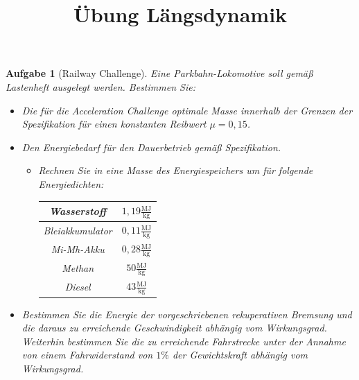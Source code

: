 \documentclass[11pt,a4paper,headsepline]{scrartcl}
\title{\"Ubung L\"angsdynamik}
\date{}
\newtheorem{aufgabe}{Aufgabe}
\begin{document}
\maketitle
\thispagestyle{fancy}
\pagestyle{fancy}
\vspace{-2cm}

\begin{aufgabe}[Railway Challenge]
\label{Ta:Acceleration}
Eine Parkbahn-Lokomotive soll gem\"a{\ss} Lastenheft ausgelegt werden. Bestimmen Sie:
\begin{itemize}
	\item Die f\"ur die Acceleration Challenge optimale Masse innerhalb der Grenzen der Spezifikation f\"ur einen konstanten Reibwert $\mu = 0{,}15$.
	\item Den Energiebedarf f\"ur den Dauerbetrieb gem\"a{\ss} Spezifikation.
	\begin{itemize}
		\item Rechnen Sie in eine Masse des Energiespeichers um f\"ur folgende Energiedichten: \vspace{.2cm} \\ 
		\centering
		\begin{tabular}{|c|c|}
		\hline
		Wasserstoff & $1{,}19 \frac{\mathrm{MJ}}{\mathrm{kg}}$ \\ \hline
		Bleiakkumulator & $0{,}11 \frac{\mathrm{MJ}}{\mathrm{kg}}$ \\ \hline
		Mi-Mh-Akku & $0{,}28 \frac{\mathrm{MJ}}{\mathrm{kg}}$ \\ \hline
		Methan & $50 \frac{\mathrm{MJ}}{\mathrm{kg}}$ \\ \hline
		Diesel & $43 \frac{\mathrm{MJ}}{\mathrm{kg}}$ \\ \hline
		\end{tabular}
		\end{itemize}
		\item Bestimmen Sie die Energie der vorgeschriebenen rekuperativen Bremsung und die daraus zu erreichende Geschwindigkeit abh\"angig vom Wirkungsgrad. Weiterhin bestimmen Sie die zu erreichende Fahrstrecke unter der Annahme von einem Fahrwiderstand von $1\%$ der Gewichtskraft abh\"angig vom Wirkungsgrad.
\end{itemize}
\end{aufgabe}
\end{document}
